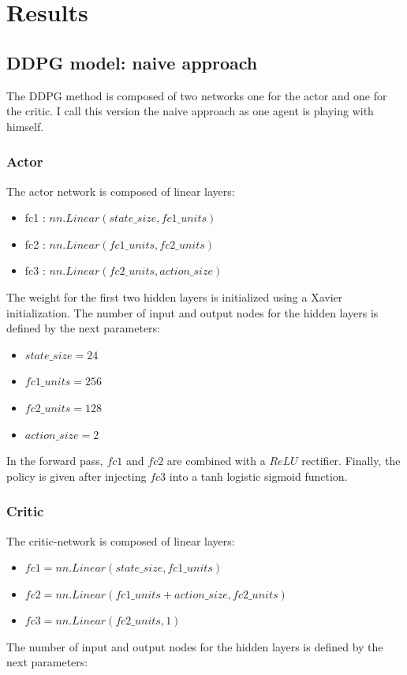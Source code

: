\documentclass[12pt]{article}
\begin{document}
\section{Results}
\subsection{DDPG model: naive approach} 
The DDPG method is composed of two networks one for the actor and one for the critic. I call this version the naive approach as one agent is playing with himself.

\subsubsection{Actor}
The actor network is composed of linear layers:
\begin{itemize}
\item fc1 : $nn.Linear(state\_size, fc1\_units)$
\item fc2 : $nn.Linear(fc1\_units, fc2\_units)$
\item fc3 : $nn.Linear(fc2\_units, action\_size)$
\end{itemize}

The weight for the first two hidden layers is initialized using a Xavier initialization.
The number of input and output nodes for the hidden layers is defined by the next parameters:

\begin{itemize}
\item $state\_size=24$
\item $fc1\_units=256$
\item $fc2\_units=128$
\item $action\_size=2$
\end{itemize}

In the forward pass, $fc1$ and $fc2$ are combined with a $ReLU$ rectifier. Finally, the policy is given after injecting $fc3$ into a tanh logistic sigmoid function.

\subsubsection{Critic}
The critic-network is composed of linear layers:

\begin{itemize}
\item $fc1 = nn.Linear(state\_size, fc1\_units)$
\item $fc2 = nn.Linear(fc1\_units+action\_size, fc2\_units)$
\item $fc3 = nn.Linear(fc2\_units, 1)$
\end{itemize}
The number of input and output nodes for the hidden layers is defined by the next parameters:
\end{document}
